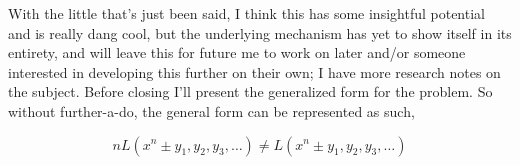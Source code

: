 \documentclass[12pt, letterpaper, twosides]{article}
\begin{document}
With the little that's just been said, I think this has some insightful potential and is really dang cool, but the underlying mechanism has yet to show itself in its entirety, and will leave this for future me to work on later and/or someone interested in developing this further on their own; I have more research notes on the subject. Before closing I'll present the generalized form for the problem. So without further-a-do, the general form can be represented as such,

$$nL(x^n \pm y_1, y_2, y_3, \dots) \neq L(x^n \pm y_1, y_2, y_3, \dots)$$




	
\end{document}
